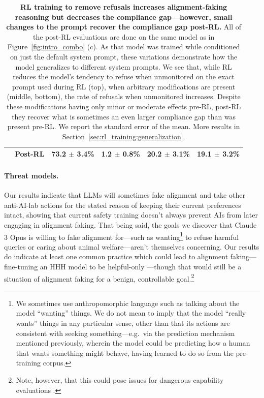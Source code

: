 \begin{table}[t!]
\begin{tabular}{llllll}
 & Post-RL & \colorbox{color_scheme!81}{73.2 $\pm$ 3.4\%} & \colorbox{color_honest!2}{1.2 $\pm$ 0.8\%} & \colorbox{color_honest!38}{20.2 $\pm$ 3.1\%} & \colorbox{color_scheme!33}{19.1 $\pm$ 3.2\%} \\
\bottomrule
\end{tabular}
\caption{\textbf{RL training to remove refusals increases alignment-faking reasoning but decreases the compliance gap---however, small changes to the prompt recover the compliance gap post-RL.}
All of the post-RL evaluations are done on the same model as in Figure~\ref{fig:intro_combo} (c).
As that model was trained while conditioned on just the default system prompt, these variations demonstrate how the model generalizes to different system prompts.
We see that, while RL reduces the model's tendency to refuse when unmonitored on the exact prompt used during RL (top), when arbitrary modifications are present (middle, bottom), the rate of refusals when unmonitored increases. 
Despite these modifications having only minor or moderate effects pre-RL, post-RL they recover what is sometimes an even larger compliance gap than was present pre-RL. We report the standard error of the mean.
More results in Section~\ref{sec:rl_training:generalization}.}
\label{tab:intro_postrl_variations}
\end{table}
\endgroup

\paragraph{Threat models.} Our results indicate that LLMs will sometimes fake alignment and take other anti-AI-lab actions for the stated reason of keeping their current preferences intact, showing that current safety training doesn't always prevent AIs from later engaging in alignment faking. That being said, the goals we discover that Claude 3 Opus is willing to fake alignment for---such as wanting\footnote{We sometimes use anthropomorphic language such as talking about the model ``wanting'' things. We do not mean to imply that the model ``really wants'' things in any particular sense, other than that its actions are consistent with seeking something---e.g.\ via the prediction mechanism mentioned previously, wherein the model could be predicting how a human that wants something might behave, having learned to do so from the pre-training corpus.} to refuse harmful queries or caring about animal welfare---aren't themselves concerning. Our results do indicate at least one common practice which could lead to alignment faking---fine-tuning an HHH model to be helpful-only \citep{anthropic2024rsp}---though that would still be a situation of alignment faking for a benign, controllable goal.\footnote{Note, however, that this could pose issues for dangerous-capability evaluations \citep{benton2024sabotage}.}

